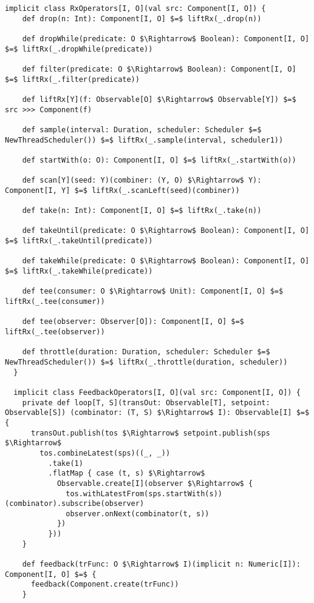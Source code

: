 \begin{lstlisting}[style=ScalaStyle, caption={Operators on \comp}, label={lst:component-operators}]
  implicit class RxOperators[I, O](val src: Component[I, O]) {
    def drop(n: Int): Component[I, O] $=$ liftRx(_.drop(n))

    def dropWhile(predicate: O $\Rightarrow$ Boolean): Component[I, O] $=$ liftRx(_.dropWhile(predicate))

    def filter(predicate: O $\Rightarrow$ Boolean): Component[I, O] $=$ liftRx(_.filter(predicate))

    def liftRx[Y](f: Observable[O] $\Rightarrow$ Observable[Y]) $=$ src >>> Component(f)

    def sample(interval: Duration, scheduler: Scheduler $=$ NewThreadScheduler()) $=$ liftRx(_.sample(interval, scheduler1))

    def startWith(o: O): Component[I, O] $=$ liftRx(_.startWith(o))

    def scan[Y](seed: Y)(combiner: (Y, O) $\Rightarrow$ Y): Component[I, Y] $=$ liftRx(_.scanLeft(seed)(combiner))

    def take(n: Int): Component[I, O] $=$ liftRx(_.take(n))

    def takeUntil(predicate: O $\Rightarrow$ Boolean): Component[I, O] $=$ liftRx(_.takeUntil(predicate))

    def takeWhile(predicate: O $\Rightarrow$ Boolean): Component[I, O] $=$ liftRx(_.takeWhile(predicate))

    def tee(consumer: O $\Rightarrow$ Unit): Component[I, O] $=$ liftRx(_.tee(consumer))

    def tee(observer: Observer[O]): Component[I, O] $=$ liftRx(_.tee(observer))

    def throttle(duration: Duration, scheduler: Scheduler $=$ NewThreadScheduler()) $=$ liftRx(_.throttle(duration, scheduler))
  }
  
  implicit class FeedbackOperators[I, O](val src: Component[I, O]) {
    private def loop[T, S](transOut: Observable[T], setpoint: Observable[S]) (combinator: (T, S) $\Rightarrow$ I): Observable[I] $=$ {
      transOut.publish(tos $\Rightarrow$ setpoint.publish(sps $\Rightarrow$
        tos.combineLatest(sps)((_, _))
          .take(1)
          .flatMap { case (t, s) $\Rightarrow$
            Observable.create[I](observer $\Rightarrow$ {
              tos.withLatestFrom(sps.startWith(s))(combinator).subscribe(observer)
              observer.onNext(combinator(t, s))
            })
          }))
    }

    def feedback(trFunc: O $\Rightarrow$ I)(implicit n: Numeric[I]): Component[I, O] $=$ {
      feedback(Component.create(trFunc))
    }


\end{lstlisting}
